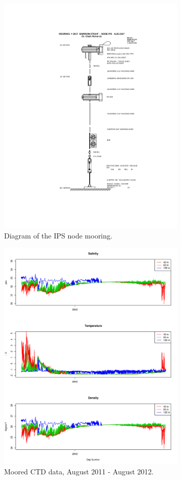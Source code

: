 \documentclass[12pt]{dforeport}
\begin{document}
\begin{figure}
\centering
\includegraphics[width = 0.8\textwidth]{./figures/IPS.png}
\caption[Mooring Diagram: IPS node]{Diagram of the IPS node mooring.}
\label{f:md_ips}
\end{figure}



\begin{figure}
\centering
\includegraphics[width = 0.8\textwidth]{./figures/05_mctd_2011_2012.png}
\caption[Moored CTD, August 2011-2012]{Moored CTD data, August 2011 - August 2012.}
\label{f:mctd_2011_2012}
\end{figure}
\end{document}
